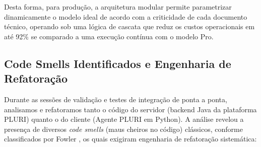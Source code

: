 \documentclass[sigconf]{acmart}
\begin{document}
Desta forma, para produção, a arquitetura modular permite parametrizar dinamicamente o modelo ideal de acordo com a criticidade de cada documento técnico, operando sob uma lógica de cascata que reduz os custos operacionais em até 92\% se comparado a uma execução contínua com o modelo Pro.

\subsection{Code Smells Identificados e Engenharia de Refatoração}
Durante as sessões de validação e testes de integração de ponta a ponta, analisamos e refatoramos tanto o código do servidor (backend Java da plataforma PLURI) quanto o do cliente (Agente PLURI em Python). A análise revelou a presença de diversos \textit{code smells} (maus cheiros no código) clássicos, conforme classificados por Fowler \cite{fowler1999refactoring}, os quais exigiram engenharia de refatoração sistemática:
\end{document}
